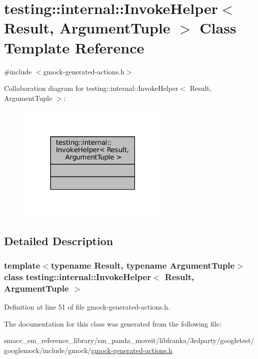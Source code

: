 \hypertarget{classtesting_1_1internal_1_1InvokeHelper}{}\section{testing\+:\+:internal\+:\+:Invoke\+Helper$<$ Result, Argument\+Tuple $>$ Class Template Reference}
\label{classtesting_1_1internal_1_1InvokeHelper}


{\ttfamily \#include $<$gmock-\/generated-\/actions.\+h$>$}



Collaboration diagram for testing\+:\+:internal\+:\+:Invoke\+Helper$<$ Result, Argument\+Tuple $>$\+:
\nopagebreak
\begin{figure}[H]
\begin{center}
\leavevmode
\includegraphics[width=206pt]{classtesting_1_1internal_1_1InvokeHelper__coll__graph}
\end{center}
\end{figure}


\subsection{Detailed Description}
\subsubsection*{template$<$typename Result, typename Argument\+Tuple$>$\newline
class testing\+::internal\+::\+Invoke\+Helper$<$ Result, Argument\+Tuple $>$}



Definition at line 51 of file gmock-\/generated-\/actions.\+h.



The documentation for this class was generated from the following file\+:\begin{DoxyCompactItemize}
\item 
smacc\+\_\+sm\+\_\+reference\+\_\+library/sm\+\_\+panda\+\_\+moveit/libfranka/3rdparty/googletest/googlemock/include/gmock/\hyperlink{gmock-generated-actions_8h}{gmock-\/generated-\/actions.\+h}\end{DoxyCompactItemize}
